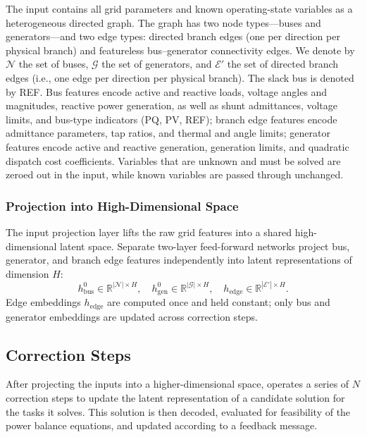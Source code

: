 The input contains all grid parameters and known operating-state variables as
a heterogeneous directed graph. The graph has two node types—buses and generators—and two edge types: directed branch edges (one per
direction per physical branch) and featureless bus--generator connectivity
edges. We denote by $\mathcal{N}$ the set of buses, $\mathcal{G}$ the set of
generators, and $\mathcal{E}'$ the set of directed branch edges (i.e., one
edge per direction per physical branch). The slack bus is denoted by REF. Bus features encode active and reactive loads, voltage angles and magnitudes, reactive power generation, as well as shunt admittances, voltage limits, and bus-type
indicators (PQ, PV, REF); branch edge features encode admittance parameters, tap ratios,
and thermal and angle limits; generator features encode active and reactive generation,
generation limits, and quadratic dispatch cost coefficients. Variables that
are unknown and must be solved are zeroed out in the input, while known
variables are passed through unchanged. 

\subsubsection{Projection into High-Dimensional Space}

The input projection layer lifts the raw grid features into a shared
high-dimensional latent space. Separate two-layer feed-forward networks
project bus, generator, and branch edge features independently into latent representations
of dimension $H$:
\begin{equation}
    \label{eq:input_proj}
  h_{\text{bus}}^0 \in \mathbb{R}^{|\mathcal{N}| \times H}, \quad
  h_{\text{gen}}^0 \in \mathbb{R}^{|\mathcal{G}| \times H}, \quad
  h_{\text{edge}} \in \mathbb{R}^{|\mathcal{E}'| \times H}.
\end{equation}
Edge embeddings $h_{\text{edge}}$ are computed once and held constant; only bus
and generator embeddings are updated across correction steps.

\subsection{Correction Steps}
\label{subsec:correction}


After projecting the inputs into a higher-dimensional space, \genco operates a series of $N$ correction steps to update the latent representation of a candidate solution for the tasks it solves. This solution is then decoded, evaluated for feasibility of the power balance equations, and updated according to a feedback message.




